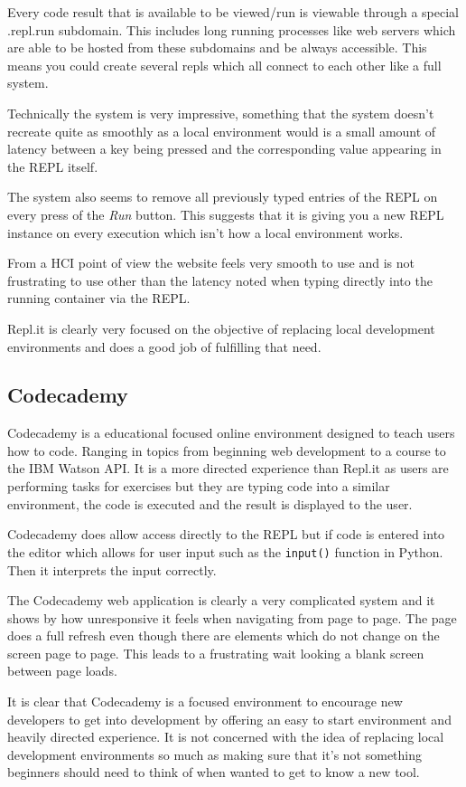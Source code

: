Every code result that is available to be viewed/run is viewable through a special .repl.run subdomain. This includes long running processes like web servers which are able to be hosted from these subdomains and be always accessible. This means you could create several repls which all connect to each other like a full system.

Technically the system is very impressive, something that the system doesn't recreate quite as smoothly as a local environment would is a small amount of latency between a key being pressed and the corresponding value appearing in the REPL itself.

The system also seems to remove all previously typed entries of the REPL on every press of the \textit{Run} button. This suggests that it is giving you a new REPL instance on every execution which isn't how a local environment works.

From a HCI point of view the website feels very smooth to use and is not frustrating to use other than the latency noted when typing directly into the running container via the REPL.

Repl.it is clearly very focused on the objective of replacing local development environments and does a good job of fulfilling that need.

\subsection{Codecademy}
Codecademy is a educational focused online environment designed to teach users how to code. Ranging in topics from beginning web development to a course to the IBM Watson API. It is a more directed experience than Repl.it as users are performing tasks for exercises but they are typing code into a similar environment, the code is executed and the result is displayed to the user.

Codecademy does allow access directly to the REPL but if code is entered into the editor which allows for user input such as the \texttt{input()} function in Python. Then it interprets the input correctly.

The Codecademy web application is clearly a very complicated system and it shows by how unresponsive it feels when navigating from page to page. The page does a full refresh even though there are elements which do not change on the screen page to page. This leads to a frustrating wait looking a blank screen between page loads.

It is clear that Codecademy is a focused environment to encourage new developers to get into development by offering an easy to start environment and heavily directed experience. It is not concerned with the idea of replacing local development environments so much as making sure that it's not something beginners should need to think of when wanted to get to know a new tool.

